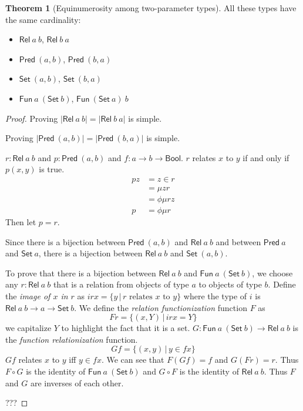 \documentclass[10pt,statementpaper]{memoir}
\theoremstyle{definition}
\newcounter{thmctr}
\newtheorem{mthm}[thmctr]{Theorem}
\newcommand\Bool{\mathsf{Bool}}
\newcommand\sfFun{\mathsf{Fun}}
\newcommand\sfSet{\mathsf{Set}}
\newcommand\sfRel{\mathsf{Rel}}
\newcommand\Set[1]{\sfSet~#1}
\newcommand\Relab[2]{\sfRel~#1~#2}
\newcommand\Fun[2]{\sfFun~#1~#2}
\newcommand\sfPred{\mathsf{Pred}}
\newcommand\Pred[1]{\sfPred~#1}
\begin{document}
\begin{mthm}[Equinumerosity among two-parameter types]
    All these types have the same cardinality:
    \begin{itemize}
        \item $\Relab{a}{b}$, $\Relab{b}{a}$
        \item $\Pred(a,b)$, $\Pred(b,a)$
        \item $\Set{(a,b)}$, $\Set{(b,a)}$
        \item $\Fun{a}{(\Set{b})}$, $\Fun{(\Set{a})}{b}$
    \end{itemize}
    \begin{proof}
        Proving $|\Relab{a}{b}| = |\Relab{b}{a}|$ is simple.

        Proving $|\Pred(a,b)| = |\Pred(b,a)|$ is simple.

        $r : \Relab{a}{b}$ and $p : \Pred(a,b)$ and $f : a \to b \to \Bool$.
        $r$ relates $x$ to $y$ if and only if $p(x,y)$ is true.
        \begin{align*}
            p z &= z \in r
             \\ &= \mu z r
             \\ &= \phi \mu r z
            \\
            p &= \phi \mu r
        \end{align*}
        Then let $p = r$.

        Since there is a bijection between $\Pred{(a,b)}$ and $\Relab{a}{b}$
        and between $\Pred{a}$ and $\Set{a}$,
        there is a bijection between $\Relab{a}{b}$ and $\Set{(a,b)}$.

        To prove that there is a bijection between $\Relab{a}{b}$ and $\Fun{a}{(\Set{b})}$,
        we choose any $r : \Relab{a}{b}$ that is a relation
        from objects of type $a$ to objects of type $b$.
        Define the \emph{image of $x$ in $r$} as
        $i r x = \{ y \,|\, \text{$r$ relates $x$ to $y$} \}$
        where the type of $i$ is $\Relab{a}{b} \to a \to \Set{b}$.
        We define the \emph{relation functionization} function $F$ as
        \[ F r = \{ (x,Y) \,|\, i r x = Y \} \]
        we capitalize $Y$ to highlight the fact that it is a set.
        $G : \Fun{a}{(\Set{b})} \to \Relab{a}{b}$ is the \emph{function relationization} function.
        \[ G f = \{ (x,y) \,|\, y \in f x \} \]
        $G f$ relates $x$ to $y$ iff $y \in f x$.
        We can see that $F(G f) = f$ and $G(F r) = r$.
        Thus $F \circ G$ is the identity of $\Fun{a}{(\Set{b})}$
        and $G \circ F$ is the identity of $\Relab{a}{b}$.
        Thus $F$ and $G$ are inverses of each other.

        ???
    \end{proof}
\end{mthm}
\end{document}
